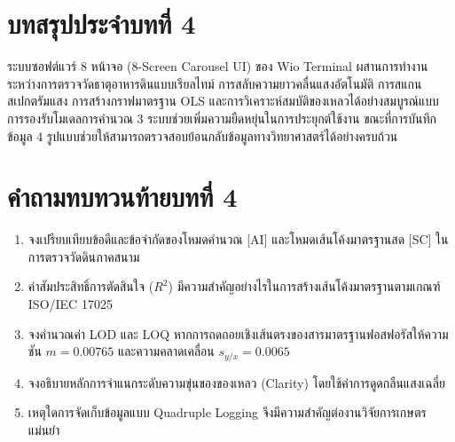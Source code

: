 \section*{บทสรุปประจำบทที่ 4}
ระบบซอฟต์แวร์ 8 หน้าจอ (8-Screen Carousel UI) ของ Wio Terminal ผสานการทำงานระหว่างการตรวจวัดธาตุอาหารดินแบบเรียลไทม์ การสลับความยาวคลื่นแสงอัตโนมัติ การสแกนสเปกตรัมแสง การสร้างกราฟมาตรฐาน OLS และการวิเคราะห์สมบัติของเหลวได้อย่างสมบูรณ์แบบ การรองรับโมเดลการคำนวณ 3 ระบบช่วยเพิ่มความยืดหยุ่นในการประยุกต์ใช้งาน ขณะที่การบันทึกข้อมูล 4 รูปแบบช่วยให้สามารถตรวจสอบย้อนกลับข้อมูลทางวิทยาศาสตร์ได้อย่างครบถ้วน

\section*{คำถามทบทวนท้ายบทที่ 4}
\begin{enumerate}[leftmargin=1.5em, itemsep=3pt]
    \item จงเปรียบเทียบข้อดีและข้อจำกัดของโหมดคำนวณ [AI] และโหมดเส้นโค้งมาตรฐานสด [SC] ในการตรวจวัดดินภาคสนาม
    \item ค่าสัมประสิทธิ์การตัดสินใจ ($R^2$) มีความสำคัญอย่างไรในการสร้างเส้นโค้งมาตรฐานตามเกณฑ์ ISO/IEC 17025
    \item จงคำนวณค่า LOD และ LOQ หากการถดถอยเชิงเส้นตรงของสารมาตรฐานฟอสฟอรัสให้ความชัน $m = 0.00765$ และความคลาดเคลื่อน $s_{y/x} = 0.0065$
    \item จงอธิบายหลักการจำแนกระดับความขุ่นของของเหลว (Clarity) โดยใช้ค่าการดูดกลืนแสงเฉลี่ย
    \item เหตุใดการจัดเก็บข้อมูลแบบ Quadruple Logging จึงมีความสำคัญต่องานวิจัยการเกษตรแม่นยำ
\end{enumerate}
